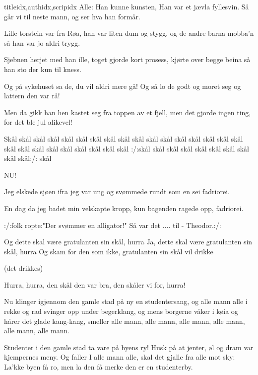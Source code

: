 \documentclass[14pt,letterpaper,norsk]{article}
\begin{document}
\begin{songs}{titleidx,authidx,scripidx}
\beginverse
Alle: Han kunne kunsten,
Han var et jævla fyllesvin.
Så går vi til neste mann, og
ser hva han formår.
\endverse
\endsong


\beginverse
Lille torstein var fra Røa,
han var liten dum og stygg,
og de andre barna mobba'n så
han var jo aldri trygg.
\endverse

\beginverse
Sjebnen herjet med han ille,
toget gjorde kort prosess,
kjørte over begge beina
så han sto der kun til kness.
\endverse

\beginverse
Og på sykehuset sa de,
du vil aldri mere gå!
Og så lo de godt og moret seg
og lattern den var rå!
\endverse

\beginverse
Men da gikk han hen kastet seg
fra toppen av et fjell,
men det gjorde ingen ting,
for det ble jul alikevel!
\endverse
\endsong

\beginverse
Skål skål skål skål skål skål skål
skål skål skål skål skål skål
skål skål skål skål skål skål skål
skål skål skål skål skål skål
:/:skål skål skål skål
skål skål skål skål skål skål:/:
skål
\endverse
\endsong

\beginverse
NU!
\endverse
\endsong

\beginverse
Jeg elskede sjøen ifra jeg var ung
og svømmede rundt som en sei
fadriorei.
\endverse

\beginverse
En dag da jeg badet min velskapte kropp,
kun bagenden ragede opp,
fadriorei.
\endverse

\beginverse
:/:folk ropte:"Der svømmer en alligator!"
Så var det .... til - Theodor.:/:
\endverse
\endsong

\beginverse
Og dette skal være gratulanten sin skål, hurra
Ja, dette skal være gratulanten sin skål, hurra
Og skam for den som ikke, gratulanten sin skål vil drikke

(det drikkes)

Hurra, hurra, den skål den var bra, den skåler vi for, hurra!
\endverse
\endsong

\beginverse
Nu klinger igjennom den gamle stad på ny en studentersang,
og alle mann alle i rekke og rad svinger opp under begerklang,
og mens borgerne våker i køia og hårer det glade kang-kang,
smeller alle mann, alle mann, alle mann, alle mann, alle mann, alle mann.
\endverse

\beginchorus
Studenter i den gamle stad ta vare på byens ry!
Husk på at jenter, øl og dram var kjempernes meny.
Og faller I alle mann alle, skal det gjalle fra alle mot sky:
La'kke byen få ro, men la den få merke den er en studenterby.
\endchorus


\end{songs}
\end{document}
